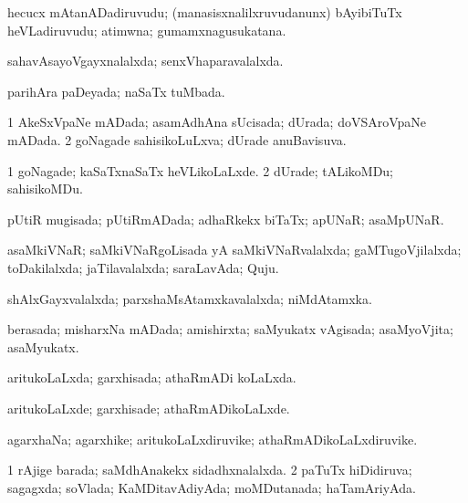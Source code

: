 \bentry
{} 
\gl{\nA}
\expl{}
\bmng
hecucx mAtanADadiruvudu; (manasisxnalilxruvudanunx) bAyibiTuTx heVLadiruvudu; atimwna; gumamxnagusukatana. 
\emng
\eentry

\bentry
{} 
\gl{\gu}
\expl{}
\bmng
 sahavAsayoVgayxnalalxda; senxVhaparavalalxda. 
\emng
\eentry

\bentry
{} 
\gl{\gu}
\expl{}
\bmng
 parihAra paDeyada; naSaTx tuMbada. 
\emng
\eentry

\bentry
{} 
\gl{\gu}
\expl{}
\bmng
\bnum
\num{1} AkeSxVpaNe mADada; asamAdhAna sUcisada; dUrada; doVSAroVpaNe mADada. 
\num{2} goNagade sahisikoLuLxva; dUrade anuBavisuva. 
\enum
\emng
\eentry

\bentry
{} 
\gl{\kirxvi}
\bmng
\bnum
\num{1} goNagade; kaSaTxnaSaTx heVLikoLaLxde. 
\num{2} dUrade; tALikoMDu; sahisikoMDu. 
\enum
\emng
\eentry

\bentry
{} 
\gl{\gu}
\expl{}
\bmng
 pUtiR mugisada; pUtiRmADada; adhaRkekx biTaTx; apUNaR; asaMpUNaR. 
\emng
\eentry

\bentry
{} 
\gl{\gu}
\expl{}
\bmng
 asaMkiVNaR; saMkiVNaRgoLisada yA saMkiVNaRvalalxda; gaMTugoVjilalxda; toDakilalxda; jaTilavalalxda; saraLavAda; Quju. 
\emng
\eentry

\bentry
{} 
\gl{\gu}
\expl{}
\bmng
 shAlxGayxvalalxda; parxshaMsAtamxkavalalxda; niMdAtamxka. 
\emng
\eentry

\bentry
{} 
\gl{\gu}
\expl{}
\bmng
 berasada; misharxNa mADada; amishirxta; saMyukatx vAgisada; asaMyoVjita; asaMyukatx. 
\emng
\eentry

\bentry
{} 
\gl{\gu}
\expl{}
\bmng
 aritukoLaLxda; garxhisada; athaRmADi koLaLxda. 
\emng
\eentry

\bentry
{} 
\gl{\kirxvi}
\expl{}
\bmng
 aritukoLaLxde; garxhisade; athaRmADikoLaLxde. 
\emng
\eentry

\bentry
{} 
\gl{\nA}
\expl{}
\bmng
 agarxhaNa; agarxhike; aritukoLaLxdiruvike; athaRmADikoLaLxdiruvike. 
\emng
\eentry

\bentry
{} 
\gl{\gu}
\expl{}
\bmng
\bnum
\num{1} rAjige barada; saMdhAnakekx sidadhxnalalxda. 
\num{2} paTuTx hiDidiruva; sagagxda; soVlada; KaMDitavAdiyAda; moMDutanada; haTamAriyAda. 
\enum
\emng
\eentry

